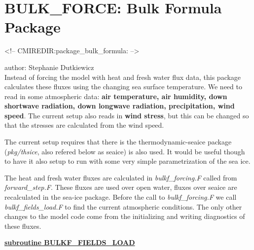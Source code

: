 % 
% 
% 
% 
% 

\def\deg{$^o$}
\section{BULK\_FORCE: Bulk Formula Package}
\label{sec:pkg:bulk_formula}
\begin{rawhtml}
<!-- CMIREDIR:package_bulk_formula: -->
\end{rawhtml}

author: Stephanie Dutkiewicz\\

\noindent
Instead of forcing the model with heat and fresh water flux data,
this package calculates these fluxes using the changing sea surface
temperature. We need to read in some atmospheric data:
{\bf air temperature, air humidity, down shortwave radiation,
     down longwave radiation, precipitation, wind speed}.
The current setup also reads in {\bf wind stress}, but this
can be changed so that the stresses are calculated from the
wind speed.

The current setup requires that there is the thermodynamic-seaice package
({\it pkg/thsice}, also refered below as seaice)
is also used. It would be useful though to have it also
setup to run with some very simple parametrization of the sea ice.


\vspace{1cm}

\noindent
The heat and fresh water fluxes are calculated in {\it bulkf\_forcing.F}
called from {\it forward\_step.F}. These fluxes are used over open water,
fluxes over seaice are recalculated in the sea-ice package.
Before the call to {\it bulkf\_forcing.F} we call 
{\it bulkf\_fields\_load.F} to find the current atmospheric conditions.
The only other changes to the model code come from the initializing
and writing diagnostics of these fluxes.

\vspace{1cm}
\noindent
{\bf \underline{subroutine BULKF\_FIELDS\_LOAD}}

